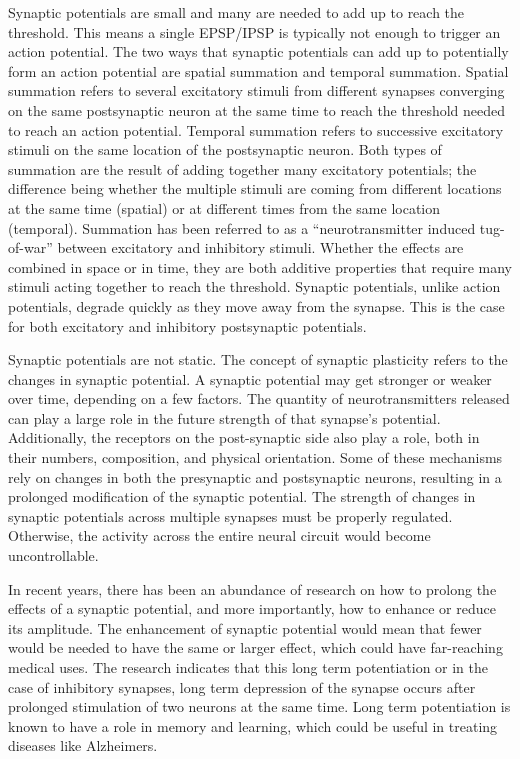 Synaptic potentials are small and many are needed to add up to reach the threshold. This means a single EPSP/IPSP is typically not enough to trigger an action potential. The two ways that synaptic potentials can add up to potentially form an action potential are spatial summation and temporal summation. Spatial summation refers to several excitatory stimuli from different synapses converging on the same postsynaptic neuron at the same time to reach the threshold needed to reach an action potential. Temporal summation refers to successive excitatory stimuli on the same location of the postsynaptic neuron. Both types of summation are the result of adding together many excitatory potentials; the difference being whether the multiple stimuli are coming from different locations at the same time (spatial) or at different times from the same location (temporal). Summation has been referred to as a ``neurotransmitter induced tug-of-war'' between excitatory and inhibitory stimuli. Whether the effects are combined in space or in time, they are both additive properties that require many stimuli acting together to reach the threshold. Synaptic potentials, unlike action potentials, degrade quickly as they move away from the synapse. This is the case for both excitatory and inhibitory postsynaptic potentials.

Synaptic potentials are not static. The concept of synaptic plasticity refers to the changes in synaptic potential. A synaptic potential may get stronger or weaker over time, depending on a few factors. The quantity of neurotransmitters released can play a large role in the future strength of that synapse's potential. Additionally, the receptors on the post-synaptic side also play a role, both in their numbers, composition, and physical orientation. Some of these mechanisms rely on changes in both the presynaptic and postsynaptic neurons, resulting in a prolonged modification of the synaptic potential. The strength of changes in synaptic potentials across multiple synapses must be properly regulated. Otherwise, the activity across the entire neural circuit would become uncontrollable.

In recent years, there has been an abundance of research on how to prolong the effects of a synaptic potential, and more importantly, how to enhance or reduce its amplitude. The enhancement of synaptic potential would mean that fewer would be needed to have the same or larger effect, which could have far-reaching medical uses. The research indicates that this long term potentiation or in the case of inhibitory synapses, long term depression of the synapse occurs after prolonged stimulation of two neurons at the same time. Long term potentiation is known to have a role in memory and learning, which could be useful in treating diseases like Alzheimers.


